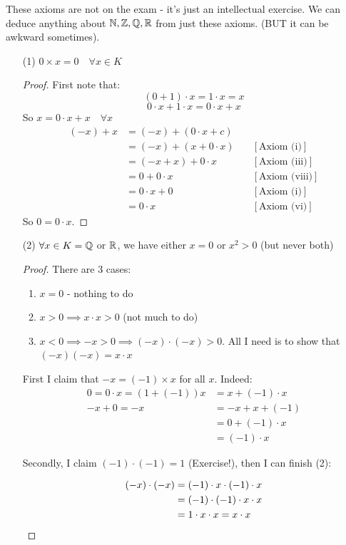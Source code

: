\documentclass[10pt]{scrartcl}
\begin{document}
These axioms are not on the exam - it's just an intellectual exercise. We can deduce anything about $\mathbb{N}, \mathbb{Z}, \mathbb{Q}, \mathbb{R}$ from just these axioms. (BUT it can be awkward sometimes). \\

\begin{examples}
\begin{itemize}
\item[(1)] $0 \times x = 0\quad \forall x \in K$
\begin{proof} First note that:
\[(0 + 1) \cdot x = 1\cdot x = x\]
\[0 \cdot x + 1\cdot x = 0 \cdot x + x\]
So $x = 0 \cdot x + x \quad \forall x$
\[
\begin{aligned}
  (-x) + x &= (-x) + (0\cdot x + c)\\
  &= (-x) + (x + 0\cdot x) \quad  &[\text{Axiom (i)}]\\
  &= (-x + x) + 0\cdot x \quad &[\text{Axiom (iii)}]\\
  &= 0 + 0\cdot x \quad &[\text{Axiom (viii)}]\\
  &= 0\cdot x + 0 \quad &[\text{Axiom (i)}]\\
  &= 0\cdot x \quad &[\text{Axiom (vi)}]
\end{aligned}
\]
So $0 = 0\cdot x$. 
\end{proof}\vspace*{5pt}

\item[(2)] $\forall x \in K = \mathbb{Q}$ or $\mathbb{R}$, we have either $x = 0$ or $x^2 > 0$ (but never both)
\begin{proof}
There are 3 cases: 
\begin{enumerate}
\item $x = 0$ - nothing to do
\item $x >  0 \implies x\cdot x > 0$ (not much to do)
\item $x < 0 \implies -x > 0 \implies (-x) \cdot (-x) > 0$. All I need is to show that $(-x)(-x) =x\cdot x$	
\end{enumerate}\vspace*{5pt}

First I claim that $-x = (-1)\times x$ for all $x$. Indeed: 
\[
\begin{aligned}
  0 = 0\cdot x = (1 + (-1))x &= x + (-1)\cdot x\\
  -x + 0 = -x &= -x + x + (-1)\\
  &= 0 + (-1)\cdot x\\
  &= (-1)\cdot x
\end{aligned}
\]

Secondly, I claim $(-1)\cdot(-1) = 1$ (Exercise!), then I can finish (2):

\begin{align*}
  (-x)\cdot(-x) &= (-1)\cdot x \cdot (-1)\cdot x\\
  &= (-1)\cdot (-1)\cdot x\cdot x\\
  &= 1\cdot x\cdot x = x \cdot x\qedhere
\end{align*}
\end{proof}	
\end{itemize}
\end{examples}\vspace*{10pt}
\end{document}
